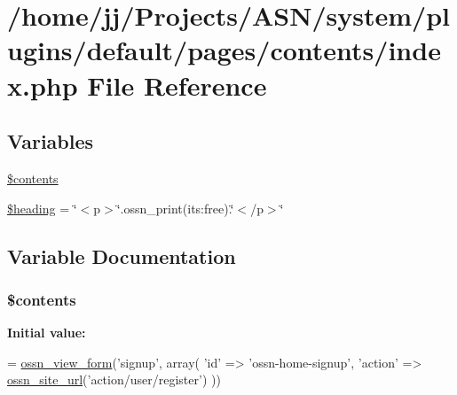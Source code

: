 \hypertarget{system_2plugins_2default_2pages_2contents_2index_8php}{}\section{/home/jj/\+Projects/\+A\+S\+N/system/plugins/default/pages/contents/index.php File Reference}
\label{system_2plugins_2default_2pages_2contents_2index_8php}
\subsection*{Variables}
\begin{DoxyCompactItemize}
\item 
\hyperlink{system_2plugins_2default_2pages_2contents_2index_8php_a87e6516f43ab874500590fe9ec8315fb}{\$contents}
\item 
\hyperlink{system_2plugins_2default_2pages_2contents_2index_8php_a196169be7715d466e3310388b096598c}{\$heading} = \char`\"{}$<$p$>$\char`\"{}.ossn\+\_\+print(\textquotesingle{}its\+:free\textquotesingle{}).\char`\"{}$<$/p$>$\char`\"{}
\end{DoxyCompactItemize}


\subsection{Variable Documentation}
\subsubsection[{\texorpdfstring{\$contents}{$contents}}]{\setlength{\rightskip}{0pt plus 5cm}\$contents}\hypertarget{system_2plugins_2default_2pages_2contents_2index_8php_a87e6516f43ab874500590fe9ec8315fb}{}\label{system_2plugins_2default_2pages_2contents_2index_8php_a87e6516f43ab874500590fe9ec8315fb}
{\bfseries Initial value\+:}
\begin{DoxyCode}
= \hyperlink{ossn_8lib_8views_8php_ac874e6342b6bbe7ac279180d7b4dcd2b}{ossn\_view\_form}(\textcolor{stringliteral}{'signup'}, array(
                            \textcolor{stringliteral}{'id'} => \textcolor{stringliteral}{'ossn-home-signup'},
                        \textcolor{stringliteral}{'action'} => \hyperlink{ossn_8lib_8system_8php_a2f12f9244f99eccd1225afb76ef2ab65}{ossn\_site\_url}(\textcolor{stringliteral}{'action/user/register'})
            ))
\end{DoxyCode}


